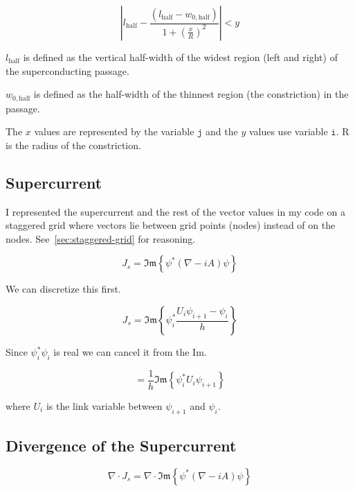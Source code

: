 \documentclass[11pt]{article}
\theoremstyle{definition}
\renewcommand{\Im}{\mathfrak{Im}}
\begin{document}
\begin{equation}
\label{eq:constriction}
\left| l_{\mathrm{half}} - \frac{(l_{\mathrm{half}} - w_{0,\mathrm{half}})}{1 + (\frac{x}{R})^2} \right| < y
\end{equation}

$l_{\mathrm{half}}$ is defined as the vertical half-width of the widest region (left and right) of the superconducting passage.

$w_{0,\mathrm{half}}$ is defined as the half-width of the thinnest region (the constriction) in the passage.

The $x$ values are represented by the variable $\texttt{j}$ and the $y$ values use variable $\texttt{i}$. R is the radius of the constriction.

\subsection{Supercurrent}
\label{sec:supercurrent}

I represented the supercurrent and the rest of the vector values in my code on a staggered grid where vectors lie between grid points (nodes) instead of on the nodes. See~\cref{sec:staggered-grid} for reasoning.

\begin{equation}
\label{eq:Js-analytic}
J_s = \Im\!\left\{ \psi^* (\nabla - i A) \psi \right\}
\end{equation}

We can discretize this first.

\begin{equation}
\label{eq:Js-disc}
J_s = \Im\!\left\{ \psi^*_i \frac{U_i \psi_{i+1} - \psi_i}{h} \right\}
\end{equation}

Since $\psi^*_i \psi_i$ is real we can cancel it from the Im.

\begin{equation}
\label{eq:Js-disc-final}
= \frac{1}{h} \Im\!\left\{ \psi^*_i U_i \psi_{i+1} \right\}
\end{equation}

where $U_i$ is the link variable between $\psi_{i+1}$ and $\psi_i$.

\subsection{Divergence of the Supercurrent}
\label{sec:div-js}

\begin{equation}
\label{eq:divJs-analytic}
\nabla \cdot J_s = \nabla \cdot \Im\!\left\{ \psi^* (\nabla - i A) \psi \right\}
\end{equation}
\end{document}
